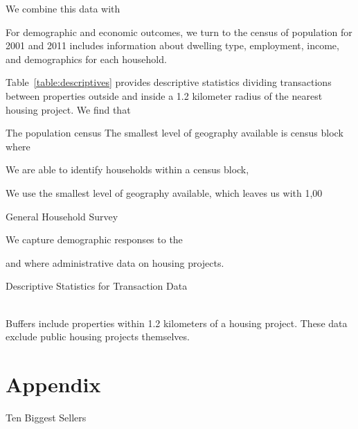 \documentclass[12pt]{article}
\begin{document}
We combine this data with 



For demographic and economic outcomes, we turn to the census of population for 2001 and 2011 includes information about dwelling type, employment, income, and demographics for each household. 




Table~\ref{table:descriptives} provides descriptive statistics dividing transactions between properties outside and inside a 1.2 kilometer radius of the nearest housing project.  We find that 



  The population census  The smallest level of geography available is census block where 

We are able to identify households within a census block,

We use the smallest level of geography available, which leaves us with 1,00



 General Household Survey







We capture demographic responses to the 

and where administrative data on housing projects.  


\begin{table}
	\centering
	\caption{Descriptive Statistics for Transaction Data}\label{table:descriptives}
	 \\
	\vspace{.2cm}
\footnotesize{Buffers include properties within 1.2 kilometers of a housing project.  These data exclude public housing projects themselves.}
\end{table}







{}
\nocite{*}
\singlespacing
\setlength\bibsep{0pt}






\appendix
\doublespacing

\section*{Appendix}

\begin{table}
	\centering
	\caption{Ten Biggest Sellers}\label{table:biggestsellers}
	
\end{table}
\end{document}
